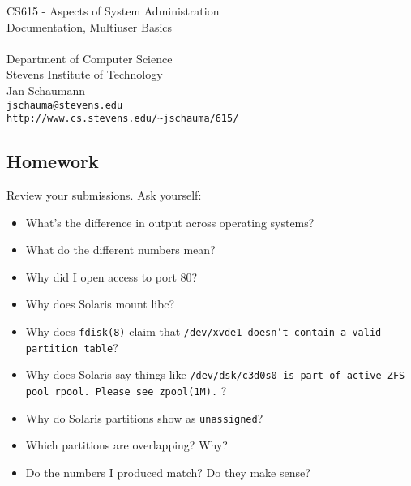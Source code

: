 \documentclass[xga]{xdvislides}
\begin{document}
\setfontphv

\lhead{\slidetitle}                               %
\cfoot{\relax}                               %
\rfoot{\Gray{\today}}

\vspace*{\fill}
\begin{center}
	\Hugesize
		CS615 - Aspects of System Administration\\ [1em]
		Documentation, Multiuser Basics\\ [1em]
	\hspace*{5mm}\blueline\\ [1em]
	\Normalsize
		Department of Computer Science\\
		Stevens Institute of Technology\\
		Jan Schaumann\\
		\verb+jschauma@stevens.edu+\\
		\verb+http://www.cs.stevens.edu/~jschauma/615/+
\end{center}
\vspace*{\fill}

\subsection{Homework}
Review your submissions.  Ask yourself:
\begin{itemize}
	\item What's the difference in output across operating systems?
	\item What do the different numbers mean?
	\item Why did I open access to port 80?
	\item Why does Solaris mount libc?
	\item Why does {\tt fdisk(8)} claim that {\tt /dev/xvde1 doesn't
		contain a valid partition table}?
	\item Why does Solaris say things like {\tt /dev/dsk/c3d0s0 is
		part of active ZFS pool rpool. Please see zpool(1M).} ?
	\item Why do Solaris partitions show as {\tt unassigned}?
	\item Which partitions are overlapping?  Why?
	\item Do the numbers I produced match?  Do they make sense?
\end{itemize}
\end{document}
